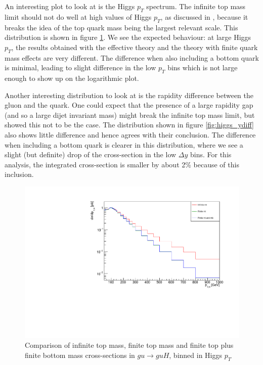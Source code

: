 An interesting plot to look at is the Higgs $p_T$ spectrum. The infinite top mass limit should not do well at high values of Higgs $p_T$, as discussed in \cite{Duca2003}, because it breaks the idea of the top quark mass being the largest relevant scale. This distribution is shown in figure \ref{fig:higgs_pt}. We see the expected behaviour: at large Higgs $p_T$, the results obtained with the effective theory and the theory with finite quark mass effects are very different. The difference when also including a bottom quark is minimal, leading to slight difference in the low $p_T$ bins which is not large enough to show up on the logarithmic plot. 

Another interesting distribution to look at is the rapidity difference between the gluon and the quark. One could expect that the presence of a large rapidity gap (and so a large dijet invariant mass) might break the infinite top mass limit, but \cite{Duca2003} showed this not to be the case. The distribution shown in figure \ref{fig:higgs_ydiff} also shows little difference and hence agrees with their conclusion. The difference when including a bottom quark is clearer in this distribution, where we see a slight (but definite) drop of the cross-section in the low $\Delta y$ bins. For this analysis, the integrated cross-section is smaller by about 2\% because of this inclusion. 

\begin{figure}[t]
\centering
\includegraphics[scale=0.75]{Images/ptH_gu.pdf}
\caption{Comparison of infinite top mass, finite top mass and finite top plus finite bottom mass cross-sections in $gu \to guH$, binned in Higgs $p_T$ }
\label{fig:higgs_pt}
\end{figure}

